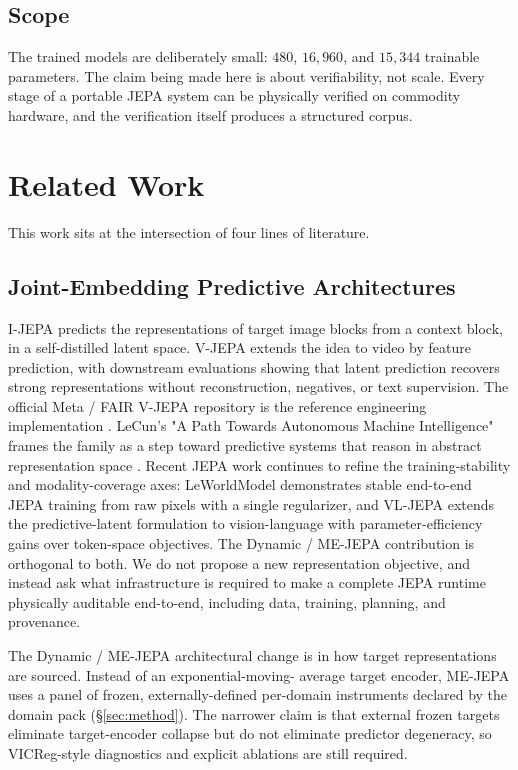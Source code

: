 \documentclass[10pt,twocolumn,letterpaper]{article}
\begin{document}
\subsection{Scope}

The trained models are deliberately small: $480$, $16{,}960$, and
$15{,}344$ trainable parameters. The claim being made here is
about verifiability, not scale. Every stage of a portable JEPA
system can be physically verified on commodity hardware, and the
verification itself produces a structured corpus.

\section{Related Work}
\label{sec:related}

This work sits at the intersection of four lines of literature.

\subsection{Joint-Embedding Predictive Architectures}

I-JEPA \citep{assran2023ijepa} predicts the representations of
target image blocks from a context block, in a self-distilled
latent space. V-JEPA \citep{bardes2024vjepa} extends the idea to
video by feature prediction, with downstream evaluations showing
that latent prediction recovers strong representations without
reconstruction, negatives, or text supervision. The official Meta /
FAIR V-JEPA repository is the reference engineering implementation
\citep{metafair2024vjepa}. LeCun's "A Path Towards Autonomous
Machine Intelligence" frames the family as a step toward
predictive systems that reason in abstract representation space
\citep{lecun2022path}. Recent JEPA work continues to refine the
training-stability and modality-coverage axes: LeWorldModel
\citep{maes2026leworldmodel} demonstrates stable end-to-end
JEPA training from raw pixels with a single regularizer, and
VL-JEPA \citep{chen2026vljepa} extends the predictive-latent
formulation to vision-language with parameter-efficiency gains
over token-space objectives. The Dynamic / ME-JEPA contribution is
orthogonal to both. We do not propose a new representation
objective, and instead ask what infrastructure is required to make
a complete JEPA runtime physically auditable end-to-end, including
data, training, planning, and provenance.

The Dynamic / ME-JEPA architectural change is in how target
representations are sourced. Instead of an exponential-moving-
average target encoder, ME-JEPA uses a panel of frozen,
externally-defined per-domain instruments declared by the domain
pack (\S\ref{sec:method}). The narrower claim is that external
frozen targets eliminate target-encoder collapse but do not
eliminate predictor degeneracy, so VICReg-style diagnostics
\citep{bardes2022vicreg} and explicit ablations are still
required.
\end{document}
